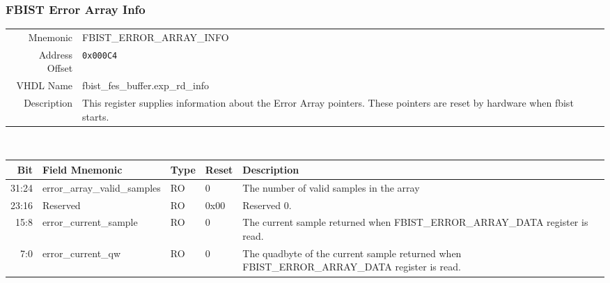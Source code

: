 \subsubsection{FBIST Error Array Info }
\begin{tabular}{ r | p{350px} }
  Mnemonic       & FBIST\_ERROR\_ARRAY\_INFO        \\
  Address Offset & \texttt{0x000C4}                 \\
  VHDL Name      & fbist\_fes\_buffer.exp\_rd\_info \\ \hline

  Description &
  This register supplies information about the Error Array
  pointers. These pointers are reset by hardware when fbist starts. \\
\end{tabular}
\\
\begin{tabularx}{\textwidth}{r|l|l|l|X}
  \hline
  Bit   & Field Mnemonic               & Type & Reset & Description \\ \hline

  31:24 & error\_array\_valid\_samples & RO   & 0     &

  The number of valid samples in the array \\

  23:16 & Reserved                     & RO   & 0x00  &

  Reserved 0. \\

  15:8  & error\_current\_sample       & RO   & 0     &

  The current sample returned when FBIST\_ERROR\_ARRAY\_DATA register
  is read. \\

  7:0   & error\_current\_qw           & RO   & 0     &

  The quadbyte of the current sample returned when
  FBIST\_ERROR\_ARRAY\_DATA register is read. \\
\end{tabularx}

